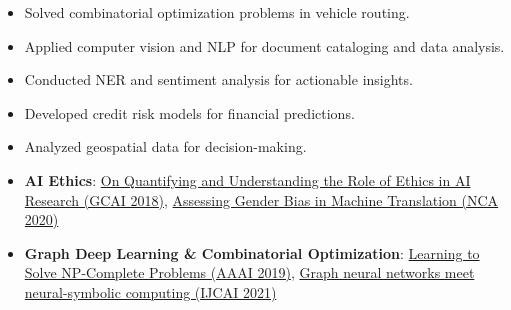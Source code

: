 \documentclass[10pt,a4paper]{altacv}
\begin{document}
{\divider
{}
\begin{itemize}
\item Solved combinatorial optimization problems in vehicle routing.
\item Applied computer vision and NLP for document cataloging and data analysis.
\item Conducted NER and sentiment analysis for actionable insights.
\item Developed credit risk models for financial predictions.
\item Analyzed geospatial data for decision-making.
\end{itemize}

\divider


\begin{itemize}
\item \textbf{AI Ethics}: {\small {\href{http://www.easychair.org/publications/paper/Z7D4}{On Quantifying and Understanding the Role of Ethics in AI Research (GCAI 2018)}}}, {\small {\href{http://arxiv.org/abs/1809.02208}{Assessing Gender Bias in Machine Translation (NCA 2020)}}}
    \item \textbf{Graph Deep Learning \& Combinatorial Optimization}: {\small {\href{http://arxiv.org/abs/1809.02721}{Learning to Solve NP-Complete Problems (AAAI 2019)}}}, {\small {\href{https://arxiv.org/pdf/1903.04598.pdf}{Graph neural networks meet neural-symbolic computing (IJCAI 2021)}}}
\end{itemize}
\divider
}
\end{document}
